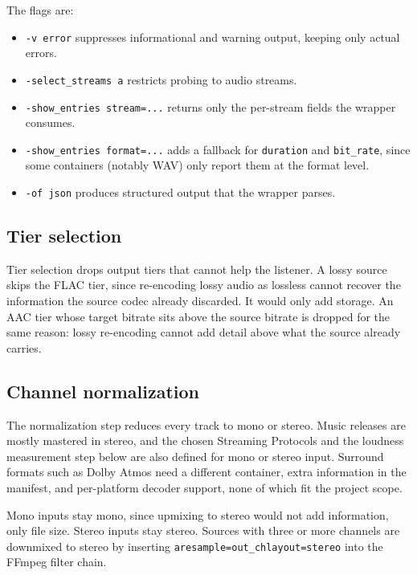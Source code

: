 \documentclass[a4paper,11pt]{article}
\begin{document}
The flags are:
\begin{itemize}
    \item \texttt{-v error} suppresses informational and warning
    output, keeping only actual errors.
    \item \texttt{-select\_streams a} restricts probing to audio
    streams.
    \item \texttt{-show\_entries stream=...} returns only the
    per-stream fields the wrapper consumes.
    \item \texttt{-show\_entries format=...} adds a fallback for
    \texttt{duration} and \texttt{bit\_rate}, since some containers
    (notably WAV) only report them at the format level.
    \item \texttt{-of json} produces structured output that the
    wrapper parses.
\end{itemize}

\subsection{Tier selection}
Tier selection drops output tiers that cannot help the listener. A
lossy source skips the FLAC tier, since re-encoding lossy audio as
lossless cannot recover the information the source codec already
discarded. It would only add storage. An AAC tier whose target bitrate
sits above the source bitrate is dropped for the same reason: lossy
re-encoding cannot add detail above what the source already carries.

\subsection{Channel normalization}
The normalization step reduces every track to mono or stereo. Music
releases are mostly mastered in stereo, and the chosen Streaming
Protocols and the loudness measurement step below are also defined for
mono or stereo input. Surround formats such as Dolby Atmos need a
different container, extra information in the manifest, and
per-platform decoder support, none of which fit the project scope.

Mono inputs stay mono, since upmixing to stereo would not add
information, only file size. Stereo inputs stay stereo. Sources with
three or more channels are downmixed to stereo by inserting
\texttt{aresample=out\_chlayout=stereo} into the FFmpeg filter chain.
\end{document}
